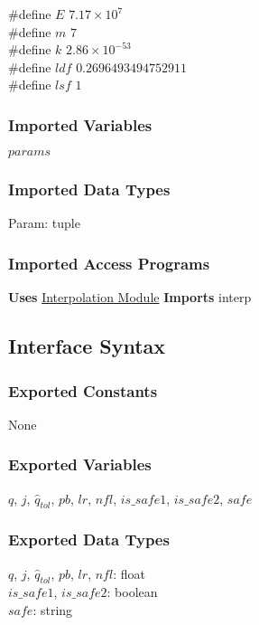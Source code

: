 \documentclass[12pt]{article}
\newcommand{\Interp}{\hyperref[SecInterp]{Interpolation Module}}
\begin{document}
\#define $E$ $7.17 \times 10^{7}$ \\
\#define $m$ $ 7$ \\
\#define $k$ $2.86 \times 10^{-53}$ \\
\#define $ldf$ $0.2696493494752911$ \\
\#define $lsf$ $1$

\subsubsection{Imported Variables}

$params$

\subsubsection{Imported Data Types}

Param: tuple 

\subsubsection{Imported Access Programs}

\textbf{Uses} \Interp{} \textbf{Imports} interp

\subsection{Interface Syntax}

\subsubsection{Exported Constants}

None

\subsubsection{Exported Variables}

$q$, $j$, $\hat{q}_{tol}$, $pb$, $lr$, $nfl$, $is\_safe1$, $is\_safe2$, $safe$

\subsubsection{Exported Data Types}

$q$, $j$, $\hat{q}_{tol}$, $pb$, $lr$, $nfl$: float \\
$is\_safe1$, $is\_safe2$: boolean \\
$safe$: string
 
\end{document}
